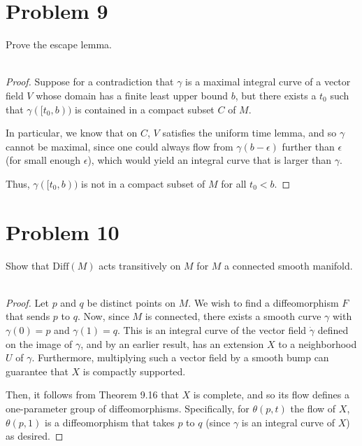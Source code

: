 \documentclass[fontsize=11pt]{scrartcl} %
\numberwithin{equation}{section} %
\numberwithin{figure}{section} %
\numberwithin{table}{section} %
\begin{document}
\section*{Problem 9}
Prove the escape lemma.
\\
\\
\begin{proof}
Suppose for a contradiction that $\gamma$ is a maximal integral curve of a
    vector field $V$ whose domain has a finite least upper bound $b$, but there
    exists a $t_0$ such that $\gamma([t_0,b))$ is contained in a compact subset
    $C$ of $M$.
    
    In particular, we know that on $C$, $V$ satisfies the uniform time lemma,
    and so $\gamma$ cannot be maximal, since one could always flow from
    $\gamma(b-\epsilon)$ further than $\epsilon$ (for small enough $\epsilon$),
    which would yield an integral curve that is larger than $\gamma$.

    Thus, $\gamma([t_0,b))$ is not in a compact subset of $M$ for all $t_0<b$.
\end{proof}

\section*{Problem 10}
Show that $\textrm{Diff}(M)$ acts transitively on $M$ for $M$ a connected smooth
manifold.
\\
\\
\begin{proof}
Let $p$ and $q$ be distinct points on $M$. We wish to find a diffeomorphism $F$
that sends $p$ to $q$. Now, since $M$ is connected, there exists a smooth curve
    $\gamma$ with $\gamma(0)=p$ and $\gamma(1)=q$. This is an integral curve of
    the vector field $\dot{\gamma}$ defined on the image of $\gamma$, and by an
    earlier result, has an extension $X$ to a neighborhood $U$ of $\gamma$.
    Furthermore, multiplying such a vector field by a smooth bump can guarantee
    that $X$ is compactly supported.

    Then, it follows from Theorem 9.16 that $X$ is complete, and so its flow
    defines a one-parameter group of diffeomorphisms. Specifically, for
    $\theta(p,t)$ the flow of $X$, $\theta(p,1)$ is a diffeomorphism that takes
    $p$ to $q$ (since $\gamma$ is an integral curve of $X$) as desired.
\end{proof}
\end{document}
